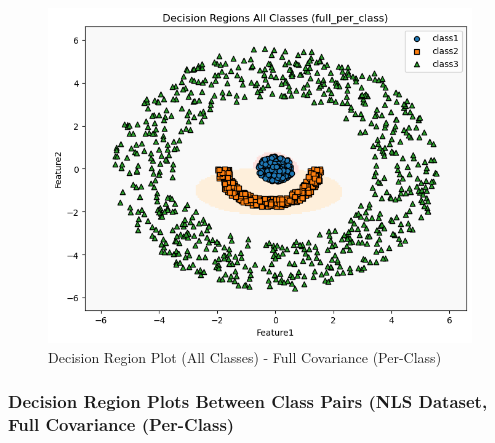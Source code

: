 \begin{figure}[H]
    \centering
    \includegraphics[width=\linewidth]{images/NLS_Group04_images/04_full_per_class/05_decision_region_all.png}
    \caption{Decision Region Plot (All Classes) - Full Covariance (Per-Class)}
\end{figure}


\subsubsection{Decision Region Plots Between Class Pairs (NLS Dataset, Full Covariance (Per-Class)}

